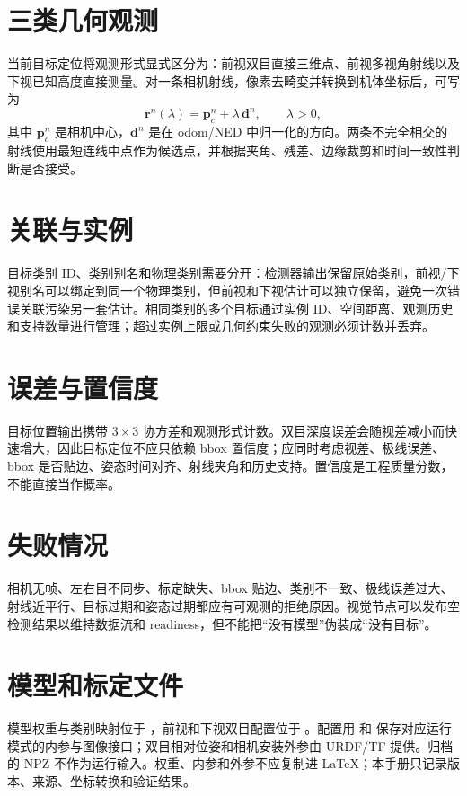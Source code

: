 \section{三类几何观测}
当前目标定位将观测形式显式区分为：前视双目直接三维点、前视多视角射线以及下视已知高度直接测量。对一条相机射线，像素去畸变并转换到机体坐标后，可写为
\begin{equation}
  \mathbf{r}^{n}(\lambda) = \mathbf{p}_{c}^{n} + \lambda\,\mathbf{d}^{n},
  \qquad \lambda>0,
\end{equation}
其中 $\mathbf{p}_{c}^{n}$ 是相机中心，$\mathbf{d}^{n}$ 是在 odom/NED 中归一化的方向。两条不完全相交的射线使用最短连线中点作为候选点，并根据夹角、残差、边缘裁剪和时间一致性判断是否接受。

\section{关联与实例}
目标类别 ID、类别别名和物理类别需要分开：检测器输出保留原始类别，前视/下视别名可以绑定到同一个物理类别，但前视和下视估计可以独立保留，避免一次错误关联污染另一套估计。相同类别的多个目标通过实例 ID、空间距离、观测历史和支持数量进行管理；超过实例上限或几何约束失败的观测必须计数并丢弃。

\section{误差与置信度}
目标位置输出携带 $3\times3$ 协方差和观测形式计数。双目深度误差会随视差减小而快速增大，因此目标定位不应只依赖 bbox 置信度；应同时考虑视差、极线误差、bbox 是否贴边、姿态时间对齐、射线夹角和历史支持。置信度是工程质量分数，不能直接当作概率。

\section{失败情况}
相机无帧、左右目不同步、标定缺失、bbox 贴边、类别不一致、极线误差过大、射线近平行、目标过期和姿态过期都应有可观测的拒绝原因。视觉节点可以发布空检测结果以维持数据流和 readiness，但不能把“没有模型”伪装成“没有目标”。

\section{模型和标定文件}
模型权重与类别映射位于 ，前视和下视双目配置位于 。配置用  和  保存对应运行模式的内参与图像接口；双目相对位姿和相机安装外参由 URDF/TF 提供。归档的 NPZ 不作为运行输入。权重、内参和外参不应复制进 LaTeX；本手册只记录版本、来源、坐标转换和验证结果。

